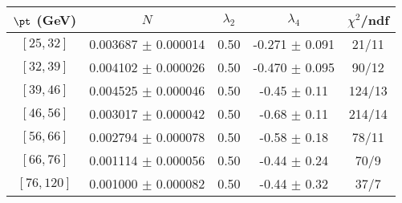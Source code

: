 \begin{tabular}{c||c|c|c|c}
$\pt$ (GeV) & $N$ & $\lambda_{2}$ & $\lambda_4$  & $\chi^2$/ndf  \\
\hline
$[25, 32]$ & 0.003687 $\pm$ 0.000014 & 0.50 & -0.271 $\pm$ 0.091 & 21/11\\
$[32, 39]$ & 0.004102 $\pm$ 0.000026 & 0.50 & -0.470 $\pm$ 0.095 & 90/12\\
$[39, 46]$ & 0.004525 $\pm$ 0.000046 & 0.50 & -0.45 $\pm$ 0.11 & 124/13\\
$[46, 56]$ & 0.003017 $\pm$ 0.000042 & 0.50 & -0.68 $\pm$ 0.11 & 214/14\\
$[56, 66]$ & 0.002794 $\pm$ 0.000078 & 0.50 & -0.58 $\pm$ 0.18 & 78/11\\
$[66, 76]$ & 0.001114 $\pm$ 0.000056 & 0.50 & -0.44 $\pm$ 0.24 & 70/9\\
$[76, 120]$ & 0.001000 $\pm$ 0.000082 & 0.50 & -0.44 $\pm$ 0.32 & 37/7\\
\end{tabular}
